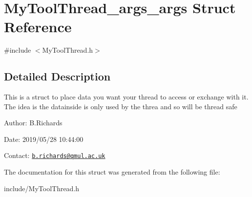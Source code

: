 \hypertarget{structMyToolThread__args__args}{\section{My\-Tool\-Thread\-\_\-args\-\_\-args Struct Reference}
\label{structMyToolThread__args__args}
}


{\ttfamily \#include $<$My\-Tool\-Thread.\-h$>$}



\subsection{Detailed Description}
This is a struct to place data you want your thread to access or exchange with it. The idea is the datainside is only used by the threa and so will be thread safe

\begin{DoxyParagraph}{Author\-:}
B.\-Richards 
\end{DoxyParagraph}
\begin{DoxyParagraph}{Date\-:}
2019/05/28 10\-:44\-:00 
\end{DoxyParagraph}
Contact\-: \href{mailto:b.richards@qmul.ac.uk}{\tt b.\-richards@qmul.\-ac.\-uk} 

The documentation for this struct was generated from the following file\-:\begin{DoxyCompactItemize}
\item 
include/My\-Tool\-Thread.\-h\end{DoxyCompactItemize}

